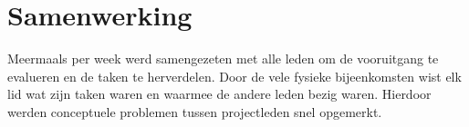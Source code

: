 
\chapter{Samenwerking} %
\label{sec:samenwerking}



Meermaals per week werd samengezeten met alle leden om de vooruitgang te evalueren en de taken te herverdelen. Door de vele fysieke bijeenkomsten wist elk lid wat zijn taken waren en waarmee de andere leden bezig waren. Hierdoor werden conceptuele problemen tussen projectleden snel opgemerkt.
